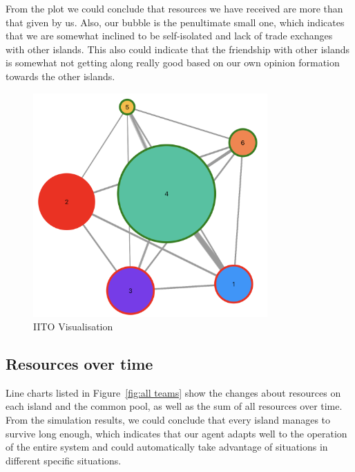 From the plot we could conclude that resources we have received are more than that given by us. Also, our bubble is the penultimate small one, which indicates that we are somewhat inclined to be self-isolated and lack of trade exchanges with other islands. This also could indicate that the friendship with other islands is somewhat not getting along really good based on our own opinion formation towards the other islands.
\begin{figure}[H]
    \centering
    \includegraphics[width=0.8\textwidth]{14_team6_agentdesign/images/IITO.png}
    \caption{IITO Visualisation}
    \label{fig:IITO}
\end{figure}

\subsection{Resources over time} \label{subsec:Team6_Eval_Resources}

Line charts listed in Figure~\ref{fig:all teams} show the changes about resources on each island and the common pool, as well as the sum of all resources over time. From the simulation results, we could conclude that every island manages to survive long enough, which indicates that our agent adapts well to the operation of the entire system and could automatically take advantage of situations in different specific situations. 

